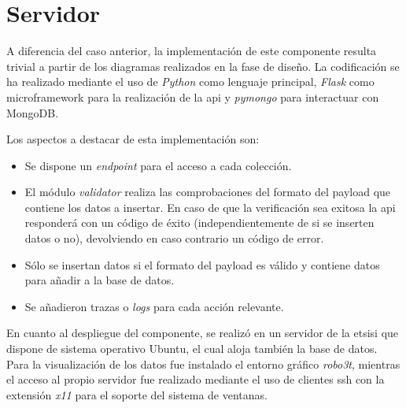     \section{Servidor}
        
        A diferencia del caso anterior, la implementación de este componente resulta trivial a partir de los diagramas realizados en la fase de diseño. La codificación se ha realizado mediante el uso de \textit{Python} como lenguaje principal, \textit{Flask} como \gls{microframework} para la realización de la \gls{api} y \textit{pymongo} para interactuar con MongoDB. 

        Los aspectos a destacar de esta implementación son:
        \begin{itemize}
            \item Se dispone un \textit{endpoint} para el acceso a cada colección.
            \item El módulo \textit{validator} realiza las comprobaciones del formato del \gls{payload} que contiene los datos a insertar. En caso de que la verificación sea exitosa la \gls{api} responderá con un código de éxito (independientemente de si se inserten datos o no), devolviendo en caso contrario un código de error.
            \item Sólo se insertan datos si el formato del \gls{payload} es válido y contiene datos para añadir a la base de datos.
            \item Se añadieron trazas o \textit{logs} para cada acción relevante.
        \end{itemize}

        En cuanto al despliegue del componente, se realizó en un servidor de la \gls{etsisi} que dispone de sistema operativo Ubuntu, el cual aloja también la base de datos. Para la visualización de los datos fue instalado el entorno gráfico \textit{robo3t}, mientras el acceso al propio servidor fue realizado mediante el uso de clientes \gls{ssh} con la extensión \textit{x11} para el soporte del sistema de ventanas. 